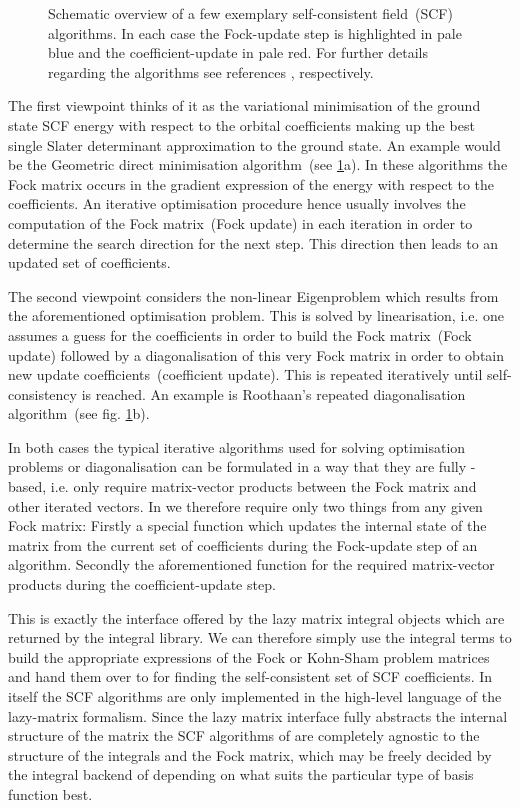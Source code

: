 \begin{figure}
	\centering
	\caption{Schematic overview of a few exemplary
		self-consistent field~(SCF) algorithms.
		In each case the Fock-update step is highlighted in pale blue
		and the coefficient-update in pale red.
		For further details regarding the algorithms see references
		\cite{Voorhis2002,Roothaan1951,Cances2000a}, respectively.
	}
	\label{fig:SCFs}
\end{figure}

The first viewpoint thinks of it as the variational minimisation
of the ground
state SCF energy with respect to the orbital coefficients making up
the best single Slater determinant approximation to the ground state.
An example would be the Geometric direct minimisation algorithm~(see \fig \ref{fig:SCFs}a).
In these algorithms the Fock matrix occurs in the gradient expression
of the energy with respect to the coefficients.
An iterative optimisation procedure hence
usually involves the computation of the Fock matrix~(Fock update)
in each iteration in order to determine the search direction
for the next step.
This direction then leads to an updated set of coefficients.

The second viewpoint considers the non-linear Eigenproblem
which results from the aforementioned optimisation problem.
This is solved by linearisation,
i.e. one assumes a guess for the coefficients
in order to build the Fock matrix~(Fock update)
followed by a diagonalisation of this very Fock matrix
in order to obtain new update coefficients~(coefficient update).
This is repeated iteratively until self-consistency is reached.
An example is Roothaan's repeated diagonalisation algorithm~(see fig. \ref{fig:SCFs}b).

In both cases the typical iterative algorithms used for
solving optimisation problems or diagonalisation
can be formulated in a way that they are fully \contraction-based,
i.e. only require matrix-vector products between the Fock matrix
and other iterated vectors.
In \gscf we therefore require only two things from any given Fock matrix:
Firstly a special \update function which updates the internal state of
the matrix from the current set of coefficients
during the Fock-update step of an algorithm.
Secondly the aforementioned \contraction function for the
required matrix-vector products
during the coefficient-update step.

This is exactly the interface offered by the lazy matrix integral objects
which are returned by the \gint integral library.
We can therefore simply use the \gint integral terms to build the appropriate expressions
of the Fock or Kohn-Sham problem matrices
and hand them over to \gscf for finding the self-consistent set of SCF coefficients.
In \gscf itself the SCF algorithms are only implemented in the
high-level language of the lazy-matrix formalism.
Since the lazy matrix interface fully abstracts the internal structure of the matrix
the SCF algorithms of \gscf
are completely agnostic to the structure of the integrals and the Fock matrix,
which may be freely decided by the integral backend of \gint
depending on what suits the particular type of basis function best.

